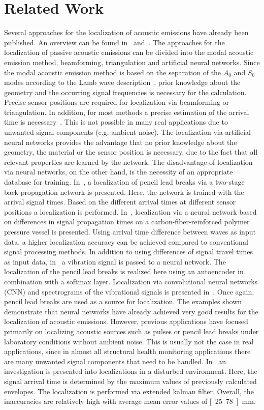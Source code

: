 \documentclass{ieeeaccess}
\begin{document}
\section{Related Work}
Several approaches for the localization of acoustic emissions have already been published. An overview can be found in~\cite{app8060958} and~\cite{9481912}. The approaches for the localization of passive acoustic emissions can be divided into the modal acoustic emission method, beamforming, triangulation and artificial neural networks. Since the modal acoustic emission method is based on the separation of the $A_0$ and $S_0$ modes according to the Lamb wave description~\cite{lamb_wave_separation}, prior knowledge about the geometry and the occurring signal frequencies is necessary for the calculation. Precise sensor positions are required for localization via beamforming or triangulation. In addition, for most methods a precise estimation of the arrival time is necessary~\cite{acoustic_em_loca}. This is not possible in many real applications due to unwanted signal components (e.g. ambient noise). The localization via artificial neural networks provides the advantage that no prior knowledge about the geometry, the material or the sensor position is necessary, due to the fact that all relevant properties are learned by the network. The disadvantage of localization via neural networks, on the other hand, is the necessity of an appropriate database for training. In~\cite{NN_localize}, a localization of pencil lead breaks via a two-stage back-propagation network is presented. Here, the network is trained with the arrival signal times. Based on the different arrival times at different sensor positions a localization is performed. In~\cite{kalafat_NN}, localization via a neural network based on differences in signal propagation times on a carbon-fiber-reinforced polymer pressure vessel is presented. Using arrival time difference between waves as input data, a higher localization accuracy can be achieved compared to conventional signal processing methods. 
In addition to using differences of signal travel times as input data, in~\cite{9151142} a vibration signal is passed to a neural network. The localization of the pencil lead breaks is realized here using an autoencoder in combination with a softmax layer. Localization via convolutional neural networks (CNN) and spectrograms of the vibrational signals is presented in~\cite{8629732}. Once again, pencil lead breaks are used as a source for localization. The examples shown demonstrate that neural networks have already achieved very good results for the localization of acoustic emissions. However, previous applications have focused primarily on localizing acoustic sources such as pulses or pencil lead breaks under laboratory conditions without ambient noise. This is usually not the case in real applications, since in almost all structural health monitoring applications there are many unwanted signal components that need to be handled. In~\cite{niri_localize} an investigation is presented into localizations in a disturbed environment. Here, the signal arrival time is determined by the maximum values of previously calculated envelopes. The localization is performed via extended kalman filter. Overall, the inaccuracies are relatively high with average mean error values of \unit[25.78]{mm}.
\end{document}
